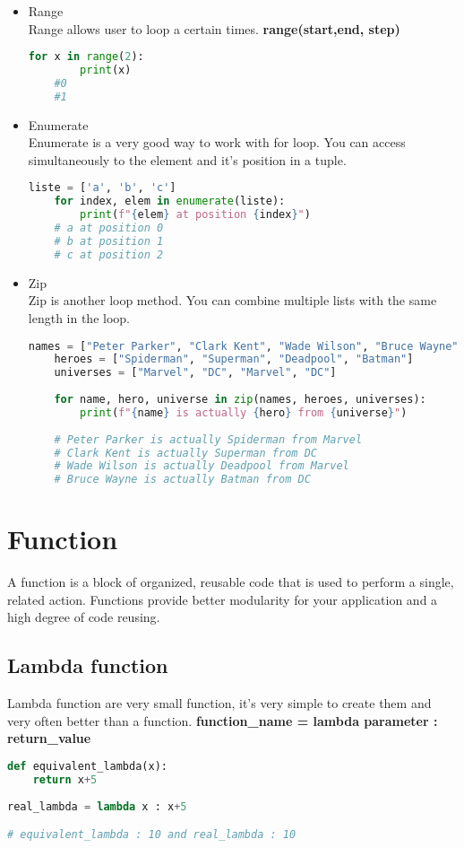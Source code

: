 \documentclass[a4paper, 12pt, titlepage]{scrartcl} %
\begin{document}
\begin{itemize}
    \item Range \\
    Range allows user to loop a certain times. \textbf{range(start,end, step)}
    \begin{lstlisting}[language=Python]
    for x in range(2):
    	print(x)
    #0
    #1
    \end{lstlisting}
    
    \item Enumerate \\
    Enumerate is a very good way to work with for loop. You can access simultaneously to the element and it's position in a tuple.
    \begin{lstlisting}[language=Python]
    liste = ['a', 'b', 'c']
    for index, elem in enumerate(liste):
    	print(f"{elem} at position {index}")
    # a at position 0
    # b at position 1
    # c at position 2
    \end{lstlisting}
    
    \item Zip \\
    Zip is another loop method. You can combine multiple lists with the same length in the loop. 
    \begin{lstlisting}[language=Python]
    names = ["Peter Parker", "Clark Kent", "Wade Wilson", "Bruce Wayne"]
    heroes = ["Spiderman", "Superman", "Deadpool", "Batman"]
    universes = ["Marvel", "DC", "Marvel", "DC"]
    
    for name, hero, universe in zip(names, heroes, universes):
    	print(f"{name} is actually {hero} from {universe}")
    	
    # Peter Parker is actually Spiderman from Marvel
    # Clark Kent is actually Superman from DC
    # Wade Wilson is actually Deadpool from Marvel
    # Bruce Wayne is actually Batman from DC
    \end{lstlisting}
\end{itemize}

\newpage
\section{Function}
\label{sec:Function}
A function is a block of organized, reusable code that is used to perform a single, related action. Functions provide better modularity for your application and a high degree of code reusing.\newline

\subsection{Lambda function}
\label{subsec:Lambda}
Lambda function are very small function, it's very simple to create them and very often better than a function. \textbf{function\_name = lambda parameter : return\_value}
\begin{lstlisting}[language=Python]
def equivalent_lambda(x):
	return x+5
	
real_lambda = lambda x : x+5

# equivalent_lambda : 10 and real_lambda : 10
\end{lstlisting}
\end{document}
